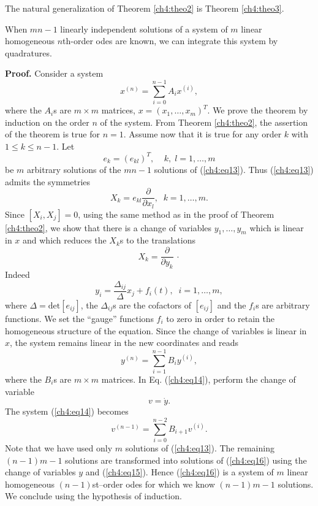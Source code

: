 {The natural generalization of Theorem \ref{ch4:theo2} is
Theorem \ref{ch4:theo3}.
\begin{theo}
\label{ch4:theo3}
\begin{em}
When $mn-1$ linearly independent solutions of a system of $m$ linear 
homogeneous $n$th-order  odes
are known, we can integrate this system by quadratures.
\end{em}
\end{theo}
{\bf Proof.}  Consider a system
\begin{equation}
x^{(n)}=\sum_{i=0}^{n-1} A_ix^{(i)},\label{ch4:eq13} 
\end{equation}
where the $A_i$s are $m\times m$ matrices, $x=(x_1,\ldots ,x_m)^T$.
We prove the theorem by induction on the order $n$ of the system. 
From Theorem \ref{ch4:theo2}, the assertion of the theorem is true for $n=1$. 
Assume now that it is true for any order $k$ with $1\le k\le n-1$. Let  
\[e_k=(e_{kl})^T,\;\;\;\; k,\;l=1,\ldots ,m\]
be $m$ arbitrary  solutions of the $mn-1$ solutions of (\ref{ch4:eq13}). 
Thus (\ref{ch4:eq13}) admits the symmetries
\[X_k=e_{kl}\frac{\partial}{\partial x_l},\;\; k=1,\ldots,m.\]
Since $[X_i,X_j]=0$, using the same method as in the proof of 
Theorem \ref{ch4:theo2}, we show that there is a change of variables
$y_1,\ldots ,y_m$ which is linear in $x$ and  which reduces the $X_k$s to
the translations
\[X_k= \frac{\partial}{\partial y_k}\,\cdot\]
Indeed
\[y_i=\frac{\Delta_{ij}}{\Delta}x_j+f_i(t),\;\; i=1,\ldots ,m, \]
where $\Delta=\mbox{det}[e_{ij}]$, the $\Delta_{ij}$s are 
the cofactors of $[e_{ij}]$ and the $f_i$s are arbitrary functions.
We set the ``gauge'' functions $f_i$ to zero in order to retain 
the homogeneous structure of the equation.
Since the change of variables is linear in $x$,  the
system remains linear in the new coordinates and reads 
\begin{equation}
y^{(n)}=\sum_{i=1}^{n-1}B_iy^{(i)}, \label{ch4:eq14}
\end{equation}
where the $B_i$s are $m\times m$ matrices. In Eq. (\ref{ch4:eq14}), perform the 
change of variable
\begin{equation}
v=\dot y. \label{ch4:eq15}
\end{equation}
The system (\ref{ch4:eq14}) becomes
\begin{equation}
v^{(n-1)}=\sum_{i=0}^{n-2} B_{i+1}v^{(i)}. \label{ch4:eq16}
\end{equation}
Note that we have used only $m$ solutions of (\ref{ch4:eq13}). The remaining
$(n-1)m-1$ solutions are transformed into solutions of (\ref{ch4:eq16}) using
the  change of variables $y$ and (\ref{ch4:eq15}). Hence (\ref{ch4:eq16}) is a system
of $m$ linear homogeneous $(n-1)$st--order odes for which we know 
$(n-1)m-1$ solutions.
We conclude using the hypothesis of induction.

}
